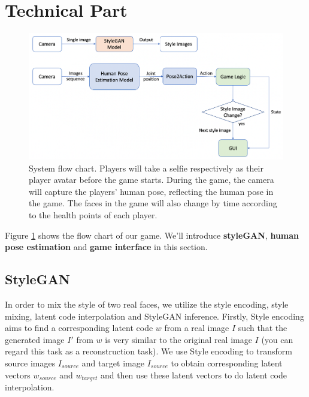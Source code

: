 \section{Technical Part}


\begin{figure}[t]
    \centering
    \includegraphics[scale=.4]{fig/flow.png}
    \caption{System flow chart. Players will take a selfie respectively as their player avatar before the game starts. During the game, the camera will capture the players’ human pose, reflecting the human pose in the game. The faces in the game will also change by time according to the health points of each player.}
    \label{fig:flow}

\end{figure}

Figure \ref{fig:flow} shows the flow chart of our game. We'll introduce \textbf{styleGAN}, \textbf{human pose estimation} and \textbf{game interface} in this section.

\subsection{StyleGAN}
In order to mix the style of two real faces, we utilize the style encoding\cite{richardson2021encoding}, style mixing, latent code interpolation and StyleGAN\cite{karras2019style} \cite{karras2020analyzing} inference. Firstly, Style encoding aims to find a corresponding latent code $w$ from a real image $I$ such that the generated image $I'$ from $w$ is very similar to the original real image $I$ (you can regard this task as a reconstruction task). We use Style encoding to transform source images $I_{source}$ and target image $I_{source}$ to obtain corresponding latent vectors $w_{source}$ and $w_{target}$ and then use these latent vectors to do latent code interpolation.


